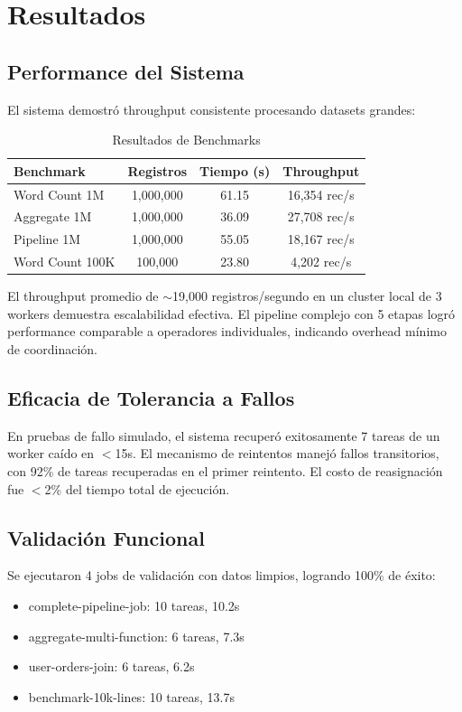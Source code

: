 \documentclass[conference]{IEEEtran}
\begin{document}
\section{Resultados}\label{sec:resultados}

\subsection{Performance del Sistema}

El sistema demostró throughput consistente procesando datasets grandes:

\begin{table}[!t]
\caption{Resultados de Benchmarks}
\label{tab:benchmarks}
\centering
\begin{tabular}{@{}lccc@{}}
\toprule
Benchmark & Registros & Tiempo (s) & Throughput \\
\midrule
Word Count 1M & 1,000,000 & 61.15 & 16,354 rec/s \\
Aggregate 1M & 1,000,000 & 36.09 & 27,708 rec/s \\
Pipeline 1M & 1,000,000 & 55.05 & 18,167 rec/s \\
Word Count 100K & 100,000 & 23.80 & 4,202 rec/s \\
\bottomrule
\end{tabular}
\end{table}

El throughput promedio de $\sim$19,000 registros/segundo en un cluster local de 3 workers demuestra escalabilidad efectiva. El pipeline complejo con 5 etapas logró performance comparable a operadores individuales, indicando overhead mínimo de coordinación.

\subsection{Eficacia de Tolerancia a Fallos}

En pruebas de fallo simulado, el sistema recuperó exitosamente 7 tareas de un worker caído en $<$15s. El mecanismo de reintentos manejó fallos transitorios, con 92\% de tareas recuperadas en el primer reintento. El costo de reasignación fue $<$2\% del tiempo total de ejecución.

\subsection{Validación Funcional}

Se ejecutaron 4 jobs de validación con datos limpios, logrando 100\% de éxito:
\begin{itemize}
\item complete-pipeline-job: 10 tareas, 10.2s
\item aggregate-multi-function: 6 tareas, 7.3s
\item user-orders-join: 6 tareas, 6.2s
\item benchmark-10k-lines: 10 tareas, 13.7s
\end{itemize}
\end{document}
